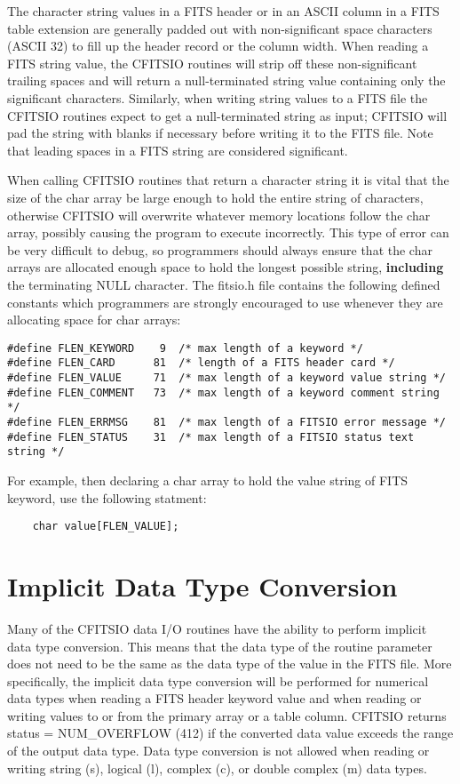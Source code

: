 The character string values in a FITS header or in an ASCII column in a
FITS table extension are generally padded out with non-significant
space characters (ASCII 32) to fill up the header record or the column
width.  When reading a FITS string value, the  CFITSIO routines will
strip off these non-significant trailing spaces and will return a
null-terminated string value containing only the significant
characters.  Similarly, when writing string values to a FITS file the
CFITSIO routines expect to get a null-terminated string as input;
CFITSIO will pad the string with blanks if necessary before writing it
to the FITS file.  Note that leading spaces in a FITS string are
considered significant.

When calling CFITSIO routines that return a character string it is
vital that the size of the char array be large enough to hold the
entire string of characters, otherwise CFITSIO will overwrite whatever
memory locations follow the char array, possibly causing the program to
execute incorrectly.  This type of error can be very difficult to
debug, so programmers should always ensure that the char arrays are
allocated enough space to hold the longest possible string, {\bf
including} the terminating NULL character.  The fitsio.h file contains
the following defined constants which programmers are strongly
encouraged to use whenever they are allocating space for char arrays:

\begin{verbatim}
#define FLEN_KEYWORD    9  /* max length of a keyword */
#define FLEN_CARD      81  /* length of a FITS header card */
#define FLEN_VALUE     71  /* max length of a keyword value string */
#define FLEN_COMMENT   73  /* max length of a keyword comment string */
#define FLEN_ERRMSG    81  /* max length of a FITSIO error message */
#define FLEN_STATUS    31  /* max length of a FITSIO status text string */
\end{verbatim}
For example, then declaring a char array to hold the value string
of FITS keyword, use the following statment:

\begin{verbatim}
    char value[FLEN_VALUE];
\end{verbatim}


\section{Implicit Data Type Conversion}

Many of the CFITSIO data I/O routines have the ability to perform
implicit data type conversion.  This means that the data type of the
routine parameter does not need to be the same as the data type of the
value in the FITS file.  More specifically, the implicit data type
conversion will be performed for numerical data types when reading a
FITS header keyword value and when reading or writing values to or from
the primary array or a table column.  CFITSIO returns status =
NUM\_OVERFLOW (412) if the converted data value exceeds the range of
the output data type.  Data type conversion is not allowed when reading
or writing string (s), logical (l), complex (c), or double complex (m)
data types.

